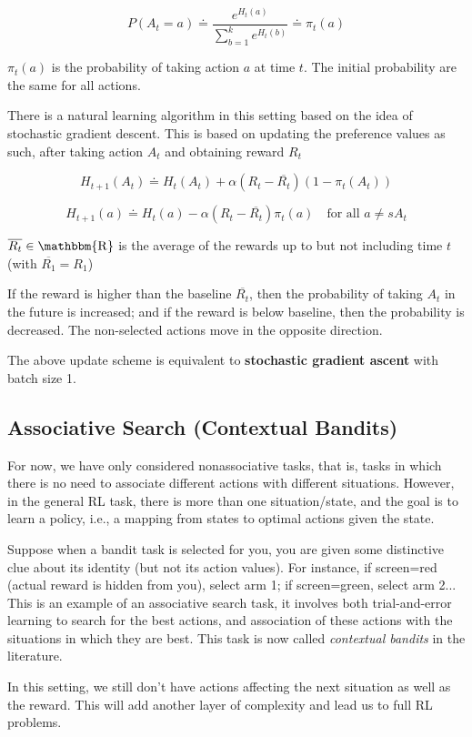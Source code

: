 \documentclass[lang=en,mode=geye,device=normal,color=blue,14pt]{elegantnote}
\DeclareMathOperator*{\1}{\mathbbm{1}}
\DeclareMathOperator*{\R}{\mathbbm{R}}
\begin{document}
\[
P(A_t=a) \doteq \frac{e^{H_t(a)}}{\sum_{b=1}^k e^{H_t(b)}} \doteq \pi_t(a)
\]

$\pi_t(a)$ is the probability of taking action $a$ at time $t$. The initial probability are the same for all actions.

There is a natural learning algorithm in this setting based on the idea of stochastic gradient descent.
This is based on updating the preference values as such, after taking action $A_t$ and obtaining reward $R_t$

$$ H_{t+1}(A_t)\doteq H_t(A_t) + \alpha (R_t - \overline{R_t})(1-\pi_t(A_t)) $$

$$ H_{t+1}(a) \doteq H_t(a) - \alpha(R_t - \overline{R_t})\pi_t(a)\quad\text{for all }a\neq sA_t $$

$\overline{R_t} \in \R $ is the average of the rewards up to but not including time $t$ (with $\overline{R_1} = R_1$)

If the reward is higher than the baseline $\overline{R_t}$, then the probability of taking $A_t$ in the future is increased; and if the reward is below baseline, then the probability is decreased.
The non-selected actions move in the opposite direction.

The above update scheme is equivalent to \textbf{stochastic gradient ascent} with batch size 1.

\subsection{Associative Search (Contextual Bandits)}

For now, we have only considered nonassociative tasks, that is, tasks in which there is no need to associate different actions with different situations.
However, in the general RL task, there is more than one situation/state, and the goal is to learn a policy, i.e., a mapping from states to optimal actions given the state.

Suppose when a bandit task is selected for you, you are given some distinctive clue about its identity (but not its action values). For instance, if screen=red (actual reward is hidden from you), select arm 1; if screen=green, select arm 2... This is an example of an associative search task, it involves both trial-and-error learning to search for the best actions, and association of these actions with the situations in which they are best. This task is now called \textit{contextual bandits} in the literature.

In this setting, we still don't have actions affecting the next situation as well as the reward. This will add another layer of complexity and lead us to full RL problems.
\end{document}

